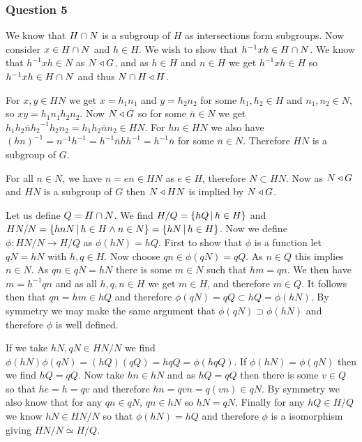\documentclass{article}
\begin{document}


\subsubsection{Question 5}

 We know that $H\cap N$ is a subgroup of $H$ as intersections form subgroups. Now consider $x \in H\cap N$ and $h \in H$. We wish to show that $h^{-1}xh \in H\cap N$. We know that $h^{-1}xh \in N$ as $N \triangleleft G$, and as $h\in H$ and $n \in H$ we get $h^{-1}xh \in H$ so $h^{-1}xh \in H \cap N$ and thus $N\cap H \triangleleft H$.

 For $x,y \in HN$ we get $x=h_1n_1$ and $y = h_2n_2$ for some $h_1,h_2 \in H$ and $n_1,n_2 \in N$, so $xy = h_1n_1h_2n_2$. Now $N\triangleleft G$ so for some $\bar n \in N$ we get $h_1h_2\bar n{h_2}^{-1}h_2n_2 = h_1h_2\bar nn_2 \in HN$. For $hn \in HN$ we also have $(hn)^{-1} = n^{-1}h^{-1} = h^{-1}\bar nhh^{-1} = h^{-1}\bar n$ for some $\bar n \in N$. Therefore $HN$ is a subgroup of $G$.

 For all $n \in N$, we have $n = en \in HN$ as $e \in H$, therefore $N \subset HN$. Now as $N\triangleleft G$ and $HN$ is a subgroup of $G$ then $N\triangleleft HN$ is implied by $N\triangleleft G$.

 Let us define $Q = H\cap N$. We find $H/Q = \left\{{hQ} \,\middle|\, {h\in H}\right\}$ and $HN/N = \left\{{hnN} \,\middle|\, {h \in H\land n \in N}\right\} = \left\{{hN} \,\middle|\, {h \in H}\right\}$. Now we define $\phi:HN/N \to H/Q$ as $\phi(hN) = hQ$. First to show that $\phi$ is a function let $qN = hN$ with $h,q \in H$. Now choose $qn \in \phi(qN) = qQ$. As $n \in Q$ this implies $n \in N$. As $qn \in qN = hN$ there is some $m \in N$ such that $hm = qn$. We then have $m = h^{-1}qn$ and as all $h,q,n \in H$ we get $m \in H$, and therefore $m \in Q$. It follows then that $qn = hm \in hQ$ and therefore $\phi(qN) = qQ \subset hQ = \phi(hN)$. By symmetry we may make the same argument that $\phi(qN)\supset \phi(hN)$ and therefore $\phi$ is well defined.

If we take $hN, qN \in HN/N$ we find $\phi(hN)\phi(qN) = (hQ)(qQ) = hqQ = \phi(hqQ)$. If $\phi(hN) = \phi(qN)$ then we find $hQ = qQ$. Now take $hn \in hN$ and as $hQ = qQ$ then there is some $v \in Q$ so that $he = h = qv$ and therefore $hn = qvn = q(vn) \in qN$. By symmetry we also know that for any $qn \in qN$, $qn \in hN$ so $hN = qN$. Finally for any $hQ \in H/Q$ we know $hN \in HN/N$ so that $\phi(hN) = hQ$ and therefore $\phi$ is a isomorphism giving $HN/N \simeq H/Q$.
\end{document}
